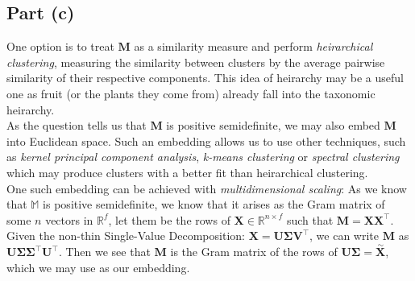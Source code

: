 \subsection{Part (c)}

One option is to treat $\mathbf{M}$ as a similarity measure and perform \textit{heirarchical clustering}, measuring the similarity between clusters by the average pairwise similarity of their respective components. This idea of heirarchy may be a useful one as fruit (or the plants they come from) already fall into the taxonomic heirarchy.\\[1em]

As the question tells us that $\mathbf{M}$ is positive semidefinite, we may also embed $\mathbf{M}$ into Euclidean space. Such an embedding allows us to use other techniques, such as \textit{kernel principal component analysis}, \textit{k-means clustering} or \textit{spectral clustering} which may produce clusters with a better fit than heirarchical clustering.\\[1em]

One such embedding can be achieved with \textit{multidimensional scaling}: As we know that $\mathbb{M}$ is positive semidefinite, we know that it arises as the Gram matrix of some $n$ vectors in $\mathbb{R}^f$, let them be the rows of $\mathbf{X}\in\mathbb{R}^{n\times f}$ such that $\mathbf{M} = \mathbf{X}\mathbf{X}^\intercal$.\\[1em]

Given the non-thin Single-Value Decomposition: $\mathbf{X} = \mathbf{U}\boldsymbol\Sigma\mathbf{V}^\intercal$, we can write $\mathbf{M}$ as $\mathbf{U}\boldsymbol\Sigma\boldsymbol\Sigma^\intercal\mathbf{U}^\intercal$. Then we see that $\mathbf{M}$ is the Gram matrix of the rows of $\mathbf{U}\boldsymbol\Sigma = \overset{\sim}{\mathbf{X}}$, which we may use as our embedding.
